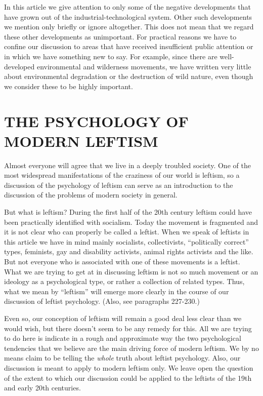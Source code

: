  In this article we give attention to only some of the negative developments that have grown out of the industrial-technological system. Other such developments we mention only briefly or ignore altogether. This does not mean that we regard these other developments as unimportant. For practical reasons we have to confine our discussion to areas that have received insufficient public attention or in which we have something new to say. For example, since there are well-developed environmental and wilderness movements, we have written very little about environmental degradation or the destruction of wild nature, even though we consider these to be highly important.

\chapter{THE PSYCHOLOGY OF MODERN LEFTISM}

 Almost everyone will agree that we live in a deeply troubled society. One of the most widespread manifestations of the craziness of our world is leftism, so a discussion of the psychology of leftism can serve as an introduction to the discussion of the problems of modern society in general.

 But what is leftism? During the first half of the 20th century leftism could have been practically identified with socialism. Today the movement is fragmented and it is not clear who can properly be called a leftist. When we speak of leftists in this article we have in mind mainly socialists, collectivists, “politically correct” types, feminists, gay and disability activists, animal rights activists and the like. But not everyone who is associated with one of these movements is a leftist. What we are trying to get at in discussing leftism is not so much movement or an ideology as a psychological type, or rather a collection of related types. Thus, what we mean by “leftism” will emerge more clearly in the course of our discussion of leftist psychology. (Also, see paragraphs 227-230.)

 Even so, our conception of leftism will remain a good deal less clear than we would wish, but there doesn’t seem to be any remedy for this. All we are trying to do here is indicate in a rough and approximate way the two psychological tendencies that we believe are the main driving force of modern leftism. We by no means claim to be telling the {\em whole} truth about leftist psychology. Also, our discussion is meant to apply to modern leftism only. We leave open the question of the extent to which our discussion could be applied to the leftists of the 19th and early 20th centuries.

